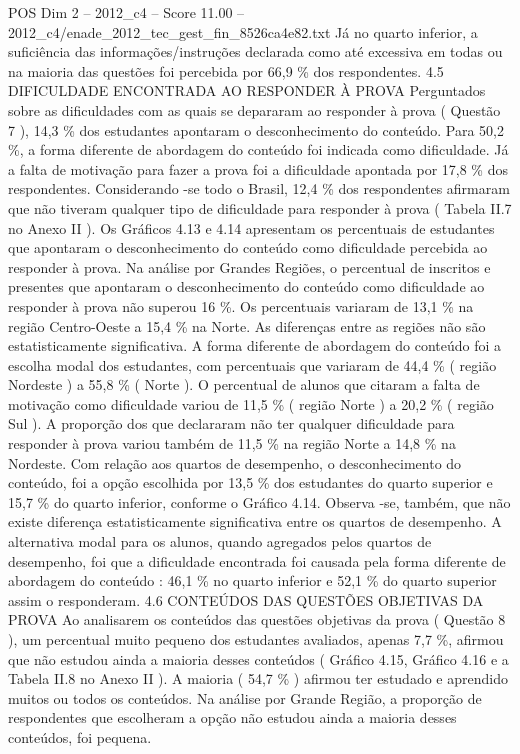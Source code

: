 \begin{textsample}{POS Dim 2 – 2012\_c4 – Score 11.00 – 2012\_c4/enade\_2012\_tec\_gest\_fin\_8526ca4e82.txt}
Já no quarto inferior, a suficiência das informações/instruções declarada como até excessiva em todas ou na maioria das questões foi percebida por 66,9 \% dos respondentes. 4.5 DIFICULDADE ENCONTRADA AO RESPONDER À PROVA Perguntados sobre as dificuldades com as quais se depararam ao responder à prova ( Questão 7 ), 14,3 \% dos estudantes apontaram o desconhecimento do conteúdo.
Para 50,2 \%, a forma diferente de abordagem do conteúdo foi indicada como dificuldade.
Já a falta de motivação para fazer a prova foi a dificuldade apontada por 17,8 \% dos respondentes.
Considerando -se todo o Brasil, 12,4 \% dos respondentes afirmaram que não tiveram qualquer tipo de dificuldade para responder à prova ( Tabela II.7 no Anexo II ).
Os Gráficos 4.13 e 4.14 apresentam os percentuais de estudantes que apontaram o desconhecimento do conteúdo como dificuldade percebida ao responder à prova.
Na análise por Grandes Regiões, o percentual de inscritos e presentes que apontaram o desconhecimento do conteúdo como dificuldade ao responder à prova não superou 16 \%.
Os percentuais variaram de 13,1 \% na região Centro-Oeste a 15,4 \% na Norte.
As diferenças entre as regiões não são estatisticamente significativa.
A forma diferente de abordagem do conteúdo foi a escolha modal dos estudantes, com percentuais que variaram de 44,4 \% ( região Nordeste ) a 55,8 \% ( Norte ).
O percentual de alunos que citaram a falta de motivação como dificuldade variou de 11,5 \% ( região Norte ) a 20,2 \% ( região Sul ).
A proporção dos que declararam não ter qualquer dificuldade para responder à prova variou também de 11,5 \% na região Norte a 14,8 \% na Nordeste.
Com relação aos quartos de desempenho, o desconhecimento do conteúdo, foi a opção escolhida por 13,5 \% dos estudantes do quarto superior e 15,7 \% do quarto inferior, conforme o Gráfico 4.14.
Observa -se, também, que não existe diferença estatisticamente significativa entre os quartos de desempenho.
A alternativa modal para os alunos, quando agregados pelos quartos de desempenho, foi que a dificuldade encontrada foi causada pela forma diferente de abordagem do conteúdo : 46,1 \% no quarto inferior e 52,1 \% do quarto superior assim o responderam. 4.6 CONTEÚDOS DAS QUESTÕES OBJETIVAS DA PROVA Ao analisarem os conteúdos das questões objetivas da prova ( Questão 8 ), um percentual muito pequeno dos estudantes avaliados, apenas 7,7 \%, afirmou que não estudou ainda a maioria desses conteúdos ( Gráfico 4.15, Gráfico 4.16 e a Tabela II.8 no Anexo II ).
A maioria ( 54,7 \% ) afirmou ter estudado e aprendido muitos ou todos os conteúdos.
Na análise por Grande Região, a proporção de respondentes que escolheram a opção não estudou ainda a maioria desses conteúdos, foi pequena.

\end{textsample}
